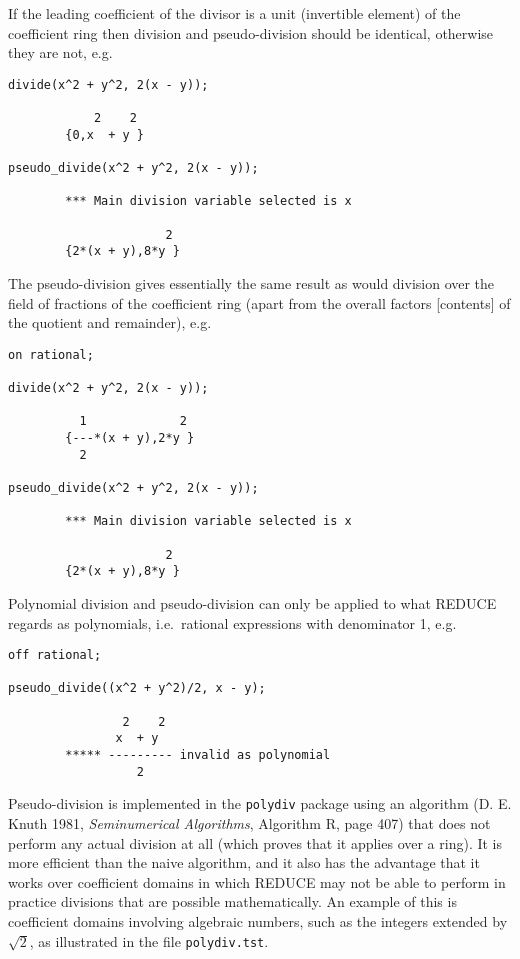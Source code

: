 If the leading coefficient of the divisor is a unit (invertible
element) of the coefficient ring then division and pseudo-division
should be identical, otherwise they are not, e.g.
\begin{verbatim}
divide(x^2 + y^2, 2(x - y));

            2    2
        {0,x  + y }

pseudo_divide(x^2 + y^2, 2(x - y));

        *** Main division variable selected is x

                      2
        {2*(x + y),8*y }
\end{verbatim}

The pseudo-division gives essentially the same result as would
division over the field of fractions of the coefficient ring (apart
from the overall factors [contents] of the quotient and remainder),
e.g.
\begin{verbatim}
on rational;

divide(x^2 + y^2, 2(x - y));

          1             2
        {---*(x + y),2*y }
          2

pseudo_divide(x^2 + y^2, 2(x - y));

        *** Main division variable selected is x

                      2
        {2*(x + y),8*y }
\end{verbatim}

Polynomial division and pseudo-division can only be applied to what
REDUCE regards as polynomials, i.e.\ rational expressions with
denominator 1, e.g.
\begin{verbatim}
off rational;

pseudo_divide((x^2 + y^2)/2, x - y);

                2    2
               x  + y
        ***** --------- invalid as polynomial
                  2
\end{verbatim}

Pseudo-division is implemented in the \texttt{polydiv} package using
an algorithm (D. E. Knuth 1981, \textit{Seminumerical Algorithms},
Algorithm R, page 407) that does not perform any actual division at
all (which proves that it applies over a ring).  It is more efficient
than the naive algorithm, and it also has the advantage that it works
over coefficient domains in which REDUCE may not be able to perform in
practice divisions that are possible mathematically.  An example of
this is coefficient domains involving algebraic numbers, such as the
integers extended by $\sqrt{2}$, as illustrated in the file
\texttt{polydiv.tst}.

